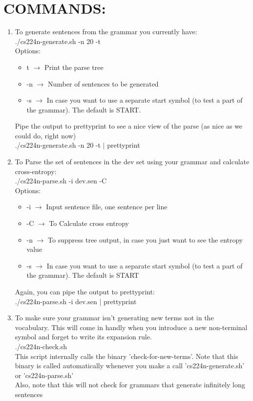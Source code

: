 \documentclass[11pt]{article}
\begin{document}
\section{COMMANDS:}
\begin{enumerate}
\item To generate sentences from the grammar you currently have: \\
./cs224n-generate.sh -n 20 -t \\ 

Options: \begin{itemize}
\item t $\rightarrow$ Print the parse tree 
        \item -n $\rightarrow$ Number of sentences to be generated 
		 \item -s $\rightarrow$ In case you want to use a separate start symbol (to test a part of the grammar). The default is START.
\end{itemize}
Pipe the output to prettyprint to see a nice view of the parse (as nice as we could do, right now) \\
./cs224n-generate.sh -n 20 -t $\mid$ prettyprint

\item  To Parse the set of sentences in the dev set using your grammar and calculate cross-entropy: \\
./cs224n-parse.sh -i dev.sen -C \\

Options: \begin{itemize} \item -i $\rightarrow$ Input sentence file, one sentence per line
 		 \item -C $\rightarrow$ To Calculate cross entropy
		 \item -n $\rightarrow$ To suppress tree output, in case you just want to see the entropy value
		 \item -s $\rightarrow$ In case you want to use a separate start symbol (to test a part of the grammar). The default is START
\end{itemize}
Again, you can pipe the output to prettyprint:\\
./cs224n-parse.sh -i dev.sen | prettyprint

\item  To make sure your grammar isn't generating new terms not in the vocabulary. This will come in handly when you introduce a new non-terminal symbol and forget to write its expansion rule. \\
./cs224n-check.sh \\
This script internally calls the binary 'check-for-new-terms'. Note that this binary is called automatically whenever you make a call 'cs224n-generate.sh' or 'cs224n-parse.sh' \\
Also, note that this will not check for grammars that generate infinitely long sentences
\end{enumerate}
\end{document}

